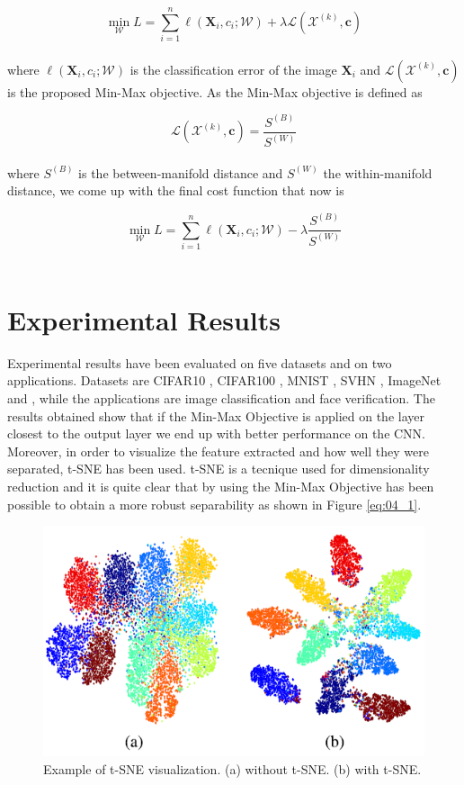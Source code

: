 \begin{equation}
    \label{eq:04_1}
    \min\limits_{\mathcal{W}} L = \sum_{i=1}^n \ell(\textbf{X}_i,c_i;\mathcal{W})+\lambda\mathcal{L}(\mathcal{X}^{(k)},\textbf{c})
\end{equation}\\
where $\ell(\textbf{X}_i,c_i;\mathcal{W})$ is the classification error of the image $\textbf{X}_i$ and $\mathcal{L}(\mathcal{X}^{(k)},\textbf{c})$ is the proposed Min-Max objective. As the Min-Max objective is defined as

\begin{equation}
    \label{eq:04_2}
    \mathcal{L}(\mathcal{X}^{(k)},\textbf{c}) = \frac{S^{(B)}}{S^{(W)}}
\end{equation}\\
where $S^{(B)}$ is the between-manifold distance and $S^{(W)}$ the within-manifold distance, we come up with the final cost function that now is

\begin{equation}
    \label{eq:04_3}
    \min\limits_{\mathcal{W}} L = \sum_{i=1}^n \ell(\textbf{X}_i,c_i;\mathcal{W})-\lambda\frac{S^{(B)}}{S^{(W)}}
\end{equation}\\

\section{Experimental Results}

Experimental results have been evaluated on five datasets and on two applications. Datasets are CIFAR10 \citep{CIFAR10and100}, CIFAR100 \citep{CIFAR10and100}, MNIST \citep{MNIST}, SVHN \citep{SVHN}, ImageNet \citep{ImageNet12} and \citep{LFW}, while the applications are image classification and face verification. The results obtained show that if the Min-Max Objective is applied on the layer closest to the output layer we end up with better performance on the CNN. Moreover, in order to visualize the feature extracted and how well they were separated, t-SNE has been used. t-SNE is a tecnique used for dimensionality reduction and it is quite clear that by using the Min-Max Objective has been possible to obtain a more robust separability as shown in Figure \ref{eq:04_1}.\\

\begin{figure}[h!]
    \centering
    \includegraphics[scale=0.60]{images/04_1.png}
    \caption{Example of t-SNE visualization. (a) without t-SNE. (b) with t-SNE.}
    \label{fig:04_1}
\end{figure}

\FloatBarrier